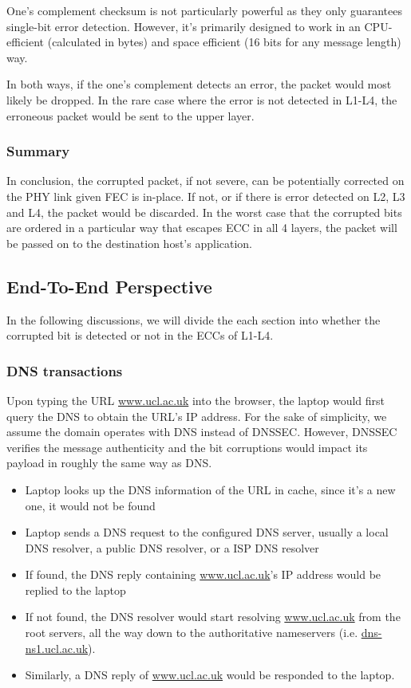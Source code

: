 \documentclass[12pt]{article}
\begin{document}
One's complement checksum is not particularly powerful as they only guarantees single-bit error detection. However, it's primarily designed to work in an CPU-efficient (calculated in bytes) and space efficient (16 bits for any message length) way.

In both ways, if the one's complement detects an error, the packet would most likely be dropped. In the rare case where the error is not detected in L1-L4, the erroneous packet would be sent to the upper layer.

\subsubsection{Summary}

In conclusion, the corrupted packet, if not severe, can be potentially corrected on the PHY link given FEC is in-place. If not, or if there is error detected on L2, L3 and L4, the packet would be discarded. In the worst case that the corrupted bits are ordered in a particular way that escapes ECC in all 4 layers, the packet will be passed on to the destination host's application.

\subsection{End-To-End Perspective}

In the following discussions, we will divide the each section into whether the corrupted bit is detected or not in the ECCs of L1-L4.

\subsubsection{DNS transactions}

Upon typing the URL \url{www.ucl.ac.uk} into the browser, the laptop would first query the DNS to obtain the URL's IP address. For the sake of simplicity, we assume the domain operates with DNS instead of DNSSEC. However, DNSSEC verifies the message authenticity and the bit corruptions would impact its payload in roughly the same way as DNS.

\begin{itemize}
    \item Laptop looks up the DNS information of the URL in cache, since it's a new one, it would not be found
    \item Laptop sends a DNS request to the configured DNS server, usually a local DNS resolver, a public DNS resolver, or a ISP DNS resolver
    \item If found, the DNS reply containing \url{www.ucl.ac.uk}'s IP address would be replied to the laptop
    \item If not found, the DNS resolver would start resolving \url{www.ucl.ac.uk} from the root servers, all the way down to the authoritative nameservers (i.e. \url{dns-ns1.ucl.ac.uk}).
    \item Similarly, a DNS reply of \url{www.ucl.ac.uk} would be responded to the laptop.
\end{itemize}
\end{document}
